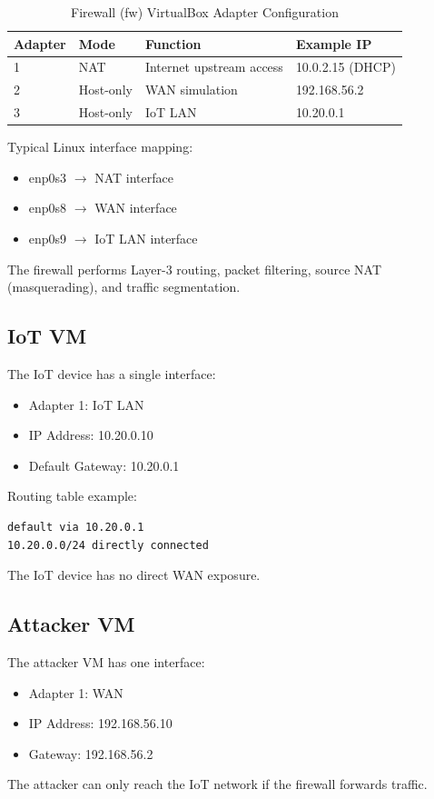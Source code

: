 \documentclass[journal]{IEEEtran}
\begin{document}
\begin{table}[!t]
\caption{Firewall (fw) VirtualBox Adapter Configuration}
\label{tab:fw_if}
\centering
\renewcommand{\arraystretch}{1.2}
\begin{tabular}{p{0.8cm} p{1.2cm} p{2.8cm} p{1.8cm}}
\hline
\textbf{Adapter} & \textbf{Mode} & \textbf{Function} & \textbf{Example IP} \\
\hline
1 & NAT & Internet upstream access & 10.0.2.15 (DHCP) \\
2 & Host-only & WAN simulation & 192.168.56.2 \\
3 & Host-only & IoT LAN & 10.20.0.1 \\
\hline
\end{tabular}
\end{table}

Typical Linux interface mapping:
\begin{itemize}
\item enp0s3 $\rightarrow$ NAT interface
\item enp0s8 $\rightarrow$ WAN interface
\item enp0s9 $\rightarrow$ IoT LAN interface
\end{itemize}

The firewall performs Layer-3 routing, packet filtering, source NAT (masquerading), and traffic segmentation.

\subsection{IoT VM}
The IoT device has a single interface:
\begin{itemize}
\item Adapter 1: IoT LAN
\item IP Address: 10.20.0.10
\item Default Gateway: 10.20.0.1
\end{itemize}
Routing table example:
\begin{lstlisting}
default via 10.20.0.1
10.20.0.0/24 directly connected
\end{lstlisting}
The IoT device has no direct WAN exposure.

\subsection{Attacker VM}
The attacker VM has one interface:
\begin{itemize}
\item Adapter 1: WAN
\item IP Address: 192.168.56.10
\item Gateway: 192.168.56.2
\end{itemize}
The attacker can only reach the IoT network if the firewall forwards traffic.
\end{document}
